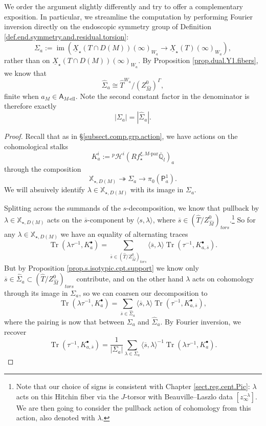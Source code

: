 \documentclass[openany]{amsbook}
\theoremstyle{definition}
\theoremstyle{remark}
\numberwithin{equation}{section}
\newcommand{\Q}{\mathbb{Q}}
\newcommand{\im}{\operatorname{im}}
\newcommand{\ol}[1]{\overline{#1}}
\newcommand{\ul}[1]{\underline{#1}}
\newcommand{\Tr}{\operatorname{Tr }}
\renewcommand{\-}{\operatorname{-}}
\newcommand{\pHi}{{}^p \mathcal{H}^i}
\newcommand{\el}{\text{-ell}}
\newcommand{\bA}{\mathsf{A}}
\newcommand{\bX}{\mathbb{X}}
\newcommand{\bAe}[1]{\bA_{#1\el}}
\newcommand{\bP}{\mathsf{P}}
\newcommand{\Mpar}{M\text{-par}}
\newcommand{\tors}{\mathit{tors}}
\begin{document}
We order the argument slightly differently and try to offer a complementary exposition. In particular, we streamline the computation by performing Fourier inversion directly on the endoscopic symmetry group of Definition \ref{def.end.symmetry.and.residual.torsion}:
$$
    \Sigma_a := \im(\ul{X}_{\star}(T \cap D(M))(\infty)_{W_a} \to \ul{X}_{\star}(T)(\infty)_{W_a}),
$$
rather than on $\ul{X}_{\star}(T \cap D(M))(\infty)_{W_a}$. By Proposition \ref{prop.dual.Y1.fibers}, we know that 
$$
    \widehat{\Sigma}_a \cong \widehat{T}^{W_a}/(Z^0_{\widehat{M}})^{\Gamma},
$$
finite when $a_M \in \bAe{M}$. Note the second constant factor in the denominator is therefore exactly 
$$
    |\Sigma_a| = |\widehat{\Sigma}_a|.
$$

\begin{proof}
    Recall that as in \S \ref{subsect.comp.grp.action}, we have actions on the cohomological stalks
    $$
        K_a^i := \pHi(R f_\star^{\xi, \Mpar} \ol{\Q}_l)_{a}
    $$
    through the composition
    $$
        \bX_{\star,D(M)} \twoheadrightarrow \Sigma_a \to \pi_0(\bP^{1}_a).
    $$
    We will absuively identify $\lambda \in \bX_{\star, D(M)}$ with its image in $\Sigma_a$.
    
    Splitting across the summands of the $s$-decomposition, we know that pullback by $\lambda \in \bX_{\star, D(M)}$ acts on the $\ol{s}$-component by $\langle s, \lambda \rangle$, where $\ol{s} \in (\widehat{T}/Z_{\widehat{M}}^0)_{\tors}$.\footnote{Note that our choice of signs is consistent with Chapter \ref{sect.reg.cent.Pic}: $\lambda$ acts on this Hitchin fiber via the $J$-torsor with Beauville--Laszlo data $[z_\infty^{-\lambda}]$. We are then going to consider the pullback action of cohomology from this action, also denoted with $\lambda$.} So for any $\lambda \in \bX_{\star, D(M)}$ we have an equality of alternating traces
    $$
        \Tr(\lambda \tau^{-1}, K_a^{\bullet}) = \sum_{\ol{s} \in (\widehat{T}/Z_{\widehat{M}}^0)_{\tors}} \langle \ol{s}, \lambda\rangle\Tr(\tau^{-1}, K_{a,\ol{s}}^{\bullet}).
    $$
    But by Proposition \ref{prop.s.isotypic.cpt.support} we know only $\ol{s} \in \widehat{\Sigma}_a \subset (\widehat{T}/Z_{\widehat{M}}^0)_{\tors}$ contribute, and on the other hand $\lambda$ acts on cohomology through its image in $\Sigma_a$, so we can coarsen our decomposition to
    $$
    \Tr(\lambda \tau^{-1}, K_a^{\bullet}) = \sum_{\ol{s} \in \widehat{\Sigma}_a} \langle \ol{s}, \lambda\rangle \Tr(\tau^{-1}, K_{a,\ol{s}}^{\bullet}),
    $$
    where the pairing is now that between $\Sigma_a$ and $\widehat{\Sigma}_a$. By Fourier inversion, we recover
    $$
        \Tr(\tau^{-1}, K_{a,\ol{s}}^{\bullet}) = \frac{1}{|\Sigma_a|} \sum_{\lambda \in \Sigma_a} \langle \ol{s}, \lambda \rangle^{-1} \Tr(\lambda \tau^{-1}, K_a^{\bullet}).
    $$


\end{proof}
\end{document}
